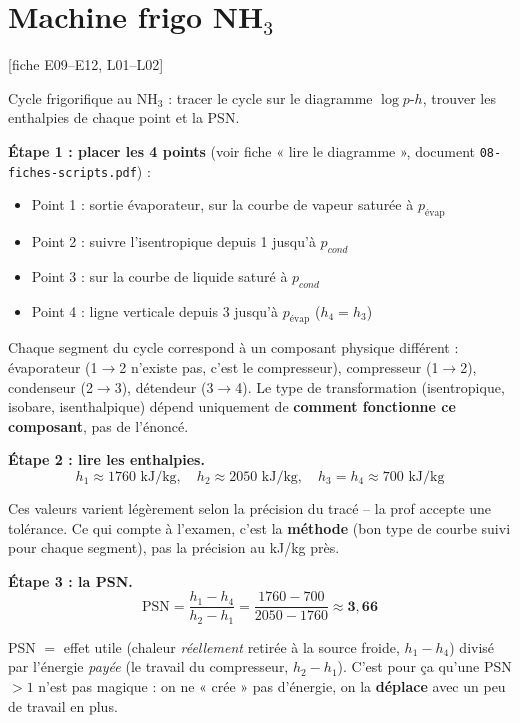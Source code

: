 \documentclass[11pt,a4paper]{article}
\newcommand{\eqb}[1]{\[\boxed{#1}\]}
\newcommand{\fiche}[1]{\hfill{\small\color{cgris}[fiche #1]}}
\begin{document}
\newpage
\section{Machine frigo NH$_3$}
\fiche{E09--E12, L01--L02}

\begin{enonce}
Cycle frigorifique au NH$_3$ : tracer le cycle sur le diagramme $\log p$-$h$, trouver les enthalpies
de chaque point et la PSN.
\end{enonce}

\begin{calc}
\textbf{Étape 1 : placer les 4 points} (voir fiche « lire le diagramme », document
\texttt{08-fiches-scripts.pdf}) :
\begin{itemize}[nosep,leftmargin=1.4em]
\item Point 1 : sortie évaporateur, sur la courbe de vapeur saturée à $p_{\text{évap}}$
\item Point 2 : suivre l'isentropique depuis 1 jusqu'à $p_{cond}$
\item Point 3 : sur la courbe de liquide saturé à $p_{cond}$
\item Point 4 : ligne verticale depuis 3 jusqu'à $p_{\text{évap}}$ ($h_4=h_3$)
\end{itemize}
\end{calc}
\begin{pourquoi}
Chaque segment du cycle correspond à un composant physique différent : évaporateur
(1$\to$2 n'existe pas, c'est le compresseur), compresseur (1$\to$2), condenseur (2$\to$3), détendeur
(3$\to$4). Le type de transformation (isentropique, isobare, isenthalpique) dépend uniquement de
\textbf{comment fonctionne ce composant}, pas de l'énoncé.
\end{pourquoi}

\begin{calc}
\textbf{Étape 2 : lire les enthalpies.}
\[ h_1\approx1760\text{ kJ/kg},\quad h_2\approx2050\text{ kJ/kg},\quad h_3=h_4\approx700\text{ kJ/kg} \]
\end{calc}
\begin{pourquoi}
Ces valeurs varient légèrement selon la précision du tracé -- la prof accepte une tolérance. Ce qui
compte à l'examen, c'est la \textbf{méthode} (bon type de courbe suivi pour chaque segment), pas la
précision au kJ/kg près.
\end{pourquoi}

\begin{calc}
\textbf{Étape 3 : la PSN.}
\eqb{\text{PSN}=\frac{h_1-h_4}{h_2-h_1} = \frac{1760-700}{2050-1760} \approx \mathbf{3{,}66}}
\end{calc}
\begin{pourquoi}
PSN $=$ effet utile (chaleur \emph{réellement} retirée à la source froide, $h_1-h_4$) divisé par
l'énergie \emph{payée} (le travail du compresseur, $h_2-h_1$). C'est pour ça qu'une PSN $>1$ n'est
pas magique : on ne « crée » pas d'énergie, on la \textbf{déplace} avec un peu de travail en plus.
\end{pourquoi}
\end{document}

